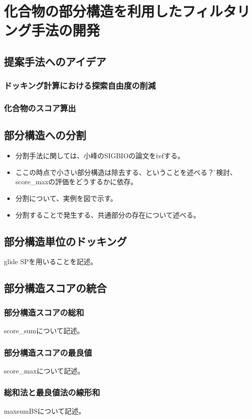 \chapter{化合物の部分構造を利用したフィルタリング手法の開発}


\section{提案手法へのアイデア}
\subsection{ドッキング計算における探索自由度の削減}
\subsection{化合物のスコア算出}

\section{部分構造への分割}

\begin{itemize}
\item 分割手法に関しては、小峰のSIGBIOの論文を\r{ref}する。
\item ここの時点で小さい部分構造は除去する、ということを述べる？\r{要検討、score\_maxの評価をどうするかに依存。}
\item 分割について、実例を図で示す。
\item 分割することで発生する、共通部分の存在について述べる。
\end{itemize}


\section{部分構造単位のドッキング}
glide SPを用いることを記述。
\section{部分構造スコアの統合}
\subsection{部分構造スコアの総和}
score\_sumについて記述。
\subsection{部分構造スコアの最良値}
score\_maxについて記述。
\subsection{総和法と最良値法の線形和}
maxsumBSについて記述。